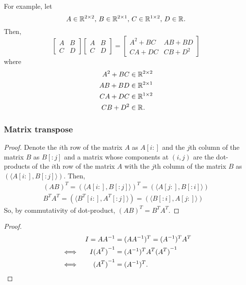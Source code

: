 \documentclass[../MathsNotesBase.tex]{subfiles}
\begin{document}
{		\biggerskip
		
		For example, let 
		\[ A \in \mathbb{R}^{2 \times 2}, \, B \in \mathbb{R}^{2 \times 1}, \, C \in \mathbb{R}^{1 \times 2}, \, D \in \mathbb{R}^{}. \]
		Then,
		\[
			\begin{bmatrix}
				A & B\\
				C & D
			\end{bmatrix}
			\begin{bmatrix}
				A & B\\
				C & D
			\end{bmatrix} =
			\begin{bmatrix}
				A^2 + BC & AB + BD\\
				CA + DC & CB + D^2
			\end{bmatrix}
		\]
		where 
		\[\begin{aligned}
			A^2 + BC &\in \mathbb{R}^{2 \times 2} \\
			AB + BD &\in \mathbb{R}^{2 \times 1} \\
			CA + DC &\in \mathbb{R}^{1 \times 2} \\
			CB + D^2 &\in \mathbb{R}^{}.
		\end{aligned}\]
		
		
		\bigskip
		\subsubsection{Matrix transpose}
		\bigskip
		\begin{proof}
			Denote the $i$th row of the matrix $A$ as $A[i:]$ and the $j$th column of the matrix $B$ as $B[:j]$ and a matrix whose components at $(i,j)$ are the dot-products of the $i$th row of the matrix $A$ with the $j$th column of the matrix $B$ as $(\langle A[i:], B[:j] \rangle)$. Then,
			\begin{align*}
			(AB)^{T} = (\langle A[i:], B[:j] \rangle)^{T} = (\langle A[j:], B[:i] \rangle) \\
			B^{T}A^{T} = (\langle B^{T}[i:], A^{T}[:j] \rangle) = (\langle B[:i], A[j:] \rangle)
			\end{align*}
			So, by commutativity of dot-product, $(AB)^{T} = B^{T}A^{T}$.
		\end{proof}
		
		\medskip
		\begin{proof}
			\begin{align*}
			&& I = A{A}^{-1} &= (AA^{-1})^{T} = (A^{-1})^{T}A^{T} \\
			& \iff & I{(A^{T})}^{-1} &= (A^{-1})^{T}A^{T}{(A^{T})}^{-1} \\
			& \iff & {(A^{T})}^{-1} &= (A^{-1})^{T}. \qedhere
			\end{align*}
		\end{proof}		
		
}
\end{document}
